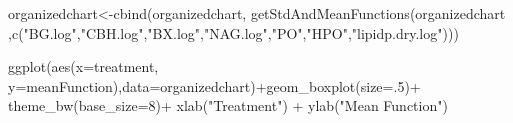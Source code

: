 \documentclass[
]{article}
\newenvironment{Shaded}{\begin{snugshade}}{\end{snugshade}}
\newcommand{\AttributeTok}[1]{\textcolor[rgb]{0.77,0.63,0.00}{#1}}
\newcommand{\DecValTok}[1]{\textcolor[rgb]{0.00,0.00,0.81}{#1}}
\newcommand{\FunctionTok}[1]{\textcolor[rgb]{0.00,0.00,0.00}{#1}}
\newcommand{\NormalTok}[1]{#1}
\newcommand{\OtherTok}[1]{\textcolor[rgb]{0.56,0.35,0.01}{#1}}
\newcommand{\SpecialCharTok}[1]{\textcolor[rgb]{0.00,0.00,0.00}{#1}}
\newcommand{\StringTok}[1]{\textcolor[rgb]{0.31,0.60,0.02}{#1}}
\begin{document}
\begin{Shaded}
\end{Shaded}

\begin{Shaded}
\begin{Highlighting}[]
\NormalTok{organizedchart}\OtherTok{\textless{}{-}}\FunctionTok{cbind}\NormalTok{(organizedchart, }\FunctionTok{getStdAndMeanFunctions}\NormalTok{(organizedchart ,}\FunctionTok{c}\NormalTok{(}\StringTok{"BG.log"}\NormalTok{,}\StringTok{"CBH.log"}\NormalTok{,}\StringTok{"BX.log"}\NormalTok{,}\StringTok{"NAG.log"}\NormalTok{,}\StringTok{"PO"}\NormalTok{,}\StringTok{"HPO"}\NormalTok{,}\StringTok{"lipidp.dry.log"}\NormalTok{)))}
\end{Highlighting}
\end{Shaded}

\begin{Shaded}
\begin{Highlighting}[]
\FunctionTok{ggplot}\NormalTok{(}\FunctionTok{aes}\NormalTok{(}\AttributeTok{x=}\NormalTok{treatment, }\AttributeTok{y=}\NormalTok{meanFunction),}\AttributeTok{data=}\NormalTok{organizedchart)}\SpecialCharTok{+}\FunctionTok{geom\_boxplot}\NormalTok{(}\AttributeTok{size=}\NormalTok{.}\DecValTok{5}\NormalTok{)}\SpecialCharTok{+}
  \FunctionTok{theme\_bw}\NormalTok{(}\AttributeTok{base\_size=}\DecValTok{8}\NormalTok{)}\SpecialCharTok{+}
  \FunctionTok{xlab}\NormalTok{(}\StringTok{"Treatment"}\NormalTok{) }\SpecialCharTok{+}
  \FunctionTok{ylab}\NormalTok{(}\StringTok{"Mean Function"}\NormalTok{)}
\end{Highlighting}
\end{Shaded}
\end{document}
